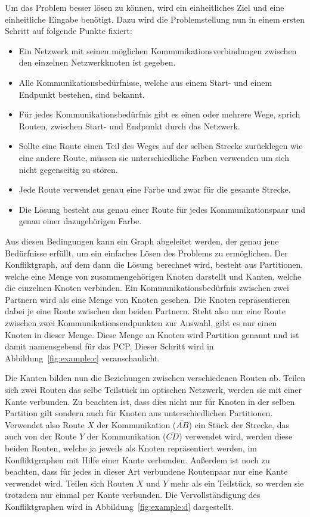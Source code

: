 Um das Problem besser lösen zu können, wird ein einheitliches Ziel und eine einheitliche Eingabe benötigt. Dazu wird die Problemstellung nun in einem ersten Schritt auf folgende Punkte fixiert:
\begin{itemize}
	\item Ein Netzwerk mit seinen möglichen Kommunikationsverbindungen zwischen den einzelnen Netzwerkknoten ist gegeben.
	\item Alle Kommunikationsbedürfnisse, welche aus einem Start- und einem Endpunkt bestehen, sind bekannt.
	\item Für jedes Kommunikationsbedürfnis gibt es einen oder mehrere Wege, sprich Routen, zwischen Start- und Endpunkt durch das Netzwerk.
	\item Sollte eine Route einen Teil des Weges auf der selben Strecke zurücklegen wie eine andere Route, müssen sie unterschiedliche Farben verwenden um sich nicht gegenseitig zu stören.
	\item Jede Route verwendet genau eine Farbe und zwar für die gesamte Strecke.
	\item Die Lösung besteht aus genau einer Route für jedes Kommunikationspaar und genau einer dazugehörigen Farbe.
\end{itemize}

Aus diesen Bedingungen kann ein Graph abgeleitet werden, der genau jene Bedürfnisse erfüllt, um ein einfaches Lösen des Problems zu ermöglichen. Der Konfliktgraph, auf dem dann die Lösung berechnet wird, besteht aus Partitionen, welche eine Menge von zusammengehörigen Knoten darstellt und Kanten, welche die einzelnen Knoten verbinden. Ein Kommunikationsbedürfnis zwischen zwei Partnern wird als eine Menge von Knoten gesehen. Die Knoten repräsentieren dabei je eine Route zwischen den beiden Partnern. Steht also nur eine Route zwischen zwei Kommunikationsendpunkten zur Auswahl, gibt es nur einen Knoten in dieser Menge. Diese Menge an Knoten wird Partition genannt und ist damit namensgebend für das PCP\@. Dieser Schritt wird in Abbildung~\ref{fig:example:c} veranschaulicht.

Die Kanten bilden nun die Beziehungen zwischen verschiedenen Routen ab. Teilen sich zwei Routen das selbe Teilstück im optischen Netzwerk, werden sie mit einer Kante verbunden. Zu beachten ist, dass dies nicht nur für Knoten in der selben Partition gilt sondern auch für Knoten aus unterschiedlichen Partitionen. Verwendet also Route $X$ der Kommunikation ($\overline{AB}$) ein Stück der Strecke, das auch von der Route $Y$ der Kommunikation ($\overline{CD}$) verwendet wird, werden diese beiden Routen, welche ja jeweils als Knoten repräsentiert werden, im Konfliktgraphen mit Hilfe einer Kante verbunden. Außerdem ist noch zu beachten, dass für jedes in dieser Art verbundene Routenpaar nur eine Kante verwendet wird. Teilen sich Routen $X$ und $Y$ mehr als ein Teilstück, so werden sie trotzdem nur einmal per Kante verbunden. Die Vervollständigung des Konfliktgraphen wird in Abbildung~\ref{fig:example:d} dargestellt.

